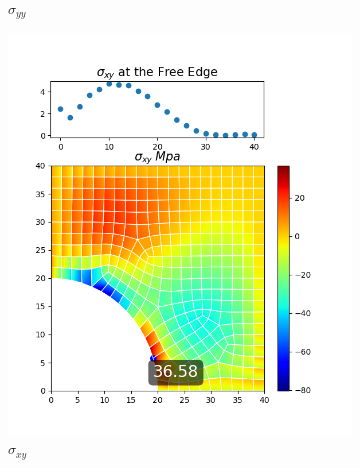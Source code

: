 \documentclass[twoside,twocolumn,10pt]{article}
\begin{document}
\begin{figure}[!ht]
\begin{subfigure}[c]{0.26\textwidth}
    \caption{$\sigma_{yy}$}
    \label{fig:y_quad}
  \end{subfigure}%
  \hfill
  \begin{subfigure}[c]{0.26\textwidth}
    \includegraphics[width=1.\linewidth]{Q2_5/Q5_1_xy_quad.png}
    \caption{$\sigma_{xy}$}
    \label{fig:xy_quad}
  \end{subfigure}%
  \begin{subfigure}[c]{0.26\textwidth}

\end{subfigure}
\end{figure}
\end{document}

